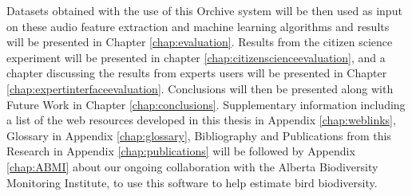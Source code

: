 Datasets obtained with the use of this Orchive system will be then
used as input on these audio feature extraction and machine learning
algorithms and results will be presented in Chapter
\ref{chap:evaluation}.  Results from the citizen science experiment
will be presented in chapter \ref{chap:citizenscienceevaluation}, and
a chapter discussing the results from experts users will be presented
in Chapter \ref{chap:expertinterfaceevaluation}.  Conclusions will
then be presented along with Future Work in Chapter
\ref{chap:conclusions}.  Supplementary information including a list of
the web resources developed in this thesis in Appendix
\ref{chap:weblinks}, Glossary in Appendix \ref{chap:glossary},
Bibliography and Publications from this Research in Appendix
\ref{chap:publications} will be followed by Appendix \ref{chap:ABMI}
about our ongoing collaboration with the Alberta Biodiversity
Monitoring Institute, to use this software to help estimate bird
biodiversity.
